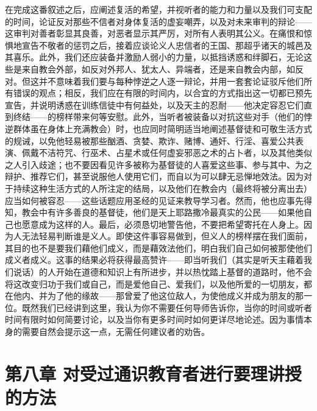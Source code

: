 在完成这番叙述之后，应阐述复活的希望，并视听者的能力和力量以及我们可支配的时间，论证反对那些不信者对身体复活的虚妄嘲弄，以及对未来审判的辩论——这审判对善者彰显其良善，对恶者显示其严厉，对所有人表明其公义。在痛恨和惊惧地宣告不敬者的惩罚之后，接着应谈论义人忠信者的王国、那超乎诸天的城邑及其喜乐。此外，我们还应装备并激励人弱小的力量，以抵挡诱惑和绊脚石，无论这些是来自教会外部，如反对外邦人、犹太人、异端者，还是来自教会内部，如反对。但这并不意味着我们要与每种悖逆之人逐一辩论，并用一套套论证驳斥他们所有错误的观点；相反，我们应在有限的时间内，以合宜的方式指出这一切都已预先宣告，并说明诱惑在训练信徒中有何益处，以及天主的忍耐——他决定容忍它们直到终结——的榜样带来何等安慰。此外，当听者被装备以对抗这些对手（他们的悖逆群体虽在身体上充满教会）时，也应同时简明适当地阐述基督徒和可敬生活方式的规诫，以免他轻易被那些酗酒、贪婪、欺诈、赌博、通奸、行淫、喜爱公共表演、佩戴不洁符咒、行巫术、占星术或任何虚妄邪恶之术的占卜者，以及其他类似之人引入歧途；也不要因看见许多被称为基督徒的人喜爱这些事、参与其中、为之辩护、推荐它们，甚至说服他人使用它们，而自以为可以肆无忌惮地效法。因为对于持续这种生活方式的人所注定的结局，以及他们在教会内（最终将被分离出去）应当如何被容忍——这些话题应用圣经的见证来教导学习者。然而，他也应事先得知，教会中有许多善良的基督徒，他们是天上耶路撒冷最真实的公民——如果他自己也愿意成为这样的人。最后，必须恳切地警告他，不要把希望寄托在人身上。因为人无法轻易判断谁是义人。即使这件事容易做到，但义人的榜样摆在我们面前，其目的也不是要我们藉他们成义，而是藉效法他们，明白我们自己如何被那使他们成义者成义。这事的结果必将获得最高赞许——即当听我们（其实是听天主藉着我们说话）的人开始在道德和知识上有所进步，并以热忱踏上基督的道路时，他不会将这改变归功于我们或自己，而是爱他自己、爱我们，以及他所爱的一切朋友，都在他内、并为了他的缘故——那曾爱了他这位敌人，为使他成义并成为朋友的那一位。既然我们已经讲到这里，我认为你不需要任何导师告诉你，当你的时间或听者时间有限时如何简要讨论，以及当你有更多时间时如何更详尽地论述。因为事情本身的需要自然会提示这一点，无需任何建议者的劝告。\par


\section{第八章 对受过通识教育者进行要理讲授的方法}

